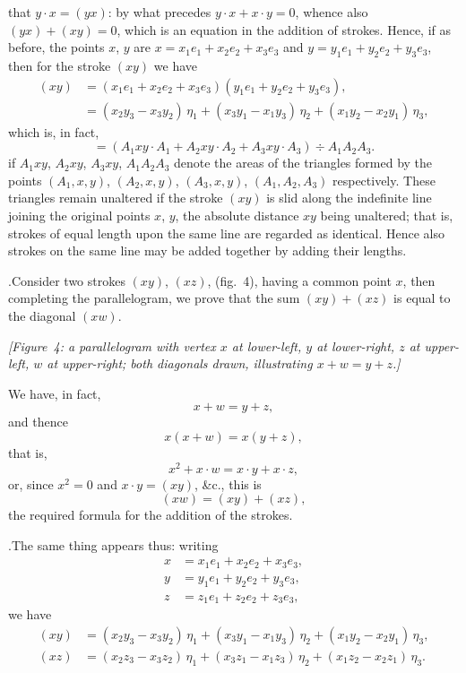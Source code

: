 \documentclass[11pt]{article}
\begin{document}
\noindent that $y\cdot x = (yx)$: by what precedes $y\cdot x + x\cdot y = 0$, whence also $(yx) + (xy) = 0$, which is an equation in the addition of strokes. Hence, if as before, the points $x$, $y$ are $x = x_{1}e_{1} + x_{2}e_{2} + x_{3}e_{3}$ and $y = y_{1}e_{1} + y_{2}e_{2} + y_{3}e_{3}$, then for the stroke $(xy)$ we have
\begin{align*}
(xy) &= (x_{1}e_{1} + x_{2}e_{2} + x_{3}e_{3})(y_{1}e_{1} + y_{2}e_{2} + y_{3}e_{3}), \\
&= (x_{2}y_{3} - x_{3}y_{2})\,\eta_{1} + (x_{3}y_{1} - x_{1}y_{3})\,\eta_{2} + (x_{1}y_{2} - x_{2}y_{1})\,\eta_{3},
\end{align*}
which is, in fact,
\[
= (A_{1}xy\cdot A_{1} + A_{2}xy\cdot A_{2} + A_{3}xy\cdot A_{3})\div A_{1}A_{2}A_{3}.
\]
if $A_{1}xy$, $A_{2}xy$, $A_{3}xy$, $A_{1}A_{2}A_{3}$ denote the areas of the triangles formed by the points $(A_{1}, x, y)$, $(A_{2}, x, y)$, $(A_{3}, x, y)$, $(A_{1}, A_{2}, A_{3})$ respectively. These triangles remain unaltered if the stroke $(xy)$ is slid along the indefinite line joining the original points $x$, $y$, the absolute distance $xy$ being unaltered; that is, strokes of equal length upon the same line are regarded as identical. Hence also strokes on the same line may be added together by adding their lengths.

\medskip

.\quad Consider two strokes $(xy)$, $(xz)$, (fig.~4), having a common point $x$, then completing the parallelogram, we prove that the sum $(xy) + (xz)$ is equal to the diagonal $(xw)$.

\medskip

\noindent\textit{[Figure~4: a parallelogram with vertex $x$ at lower-left, $y$ at lower-right, $z$ at upper-left, $w$ at upper-right; both diagonals drawn, illustrating $x + w = y + z$.]}

\medskip

\noindent We have, in fact,
\[
x + w = y + z,
\]
and thence
\[
x(x + w) = x(y + z),
\]
that is,
\[
x^{2} + x\cdot w = x\cdot y + x\cdot z,
\]
or, since $x^{2} = 0$ and $x\cdot y = (xy)$, \&c., this is
\[
(xw) = (xy) + (xz),
\]
the required formula for the addition of the strokes.

\medskip

.\quad The same thing appears thus: writing
\begin{align*}
x &= x_{1}e_{1} + x_{2}e_{2} + x_{3}e_{3}, \\
y &= y_{1}e_{1} + y_{2}e_{2} + y_{3}e_{3}, \\
z &= z_{1}e_{1} + z_{2}e_{2} + z_{3}e_{3},
\end{align*}
we have
\begin{align*}
(xy) &= (x_{2}y_{3} - x_{3}y_{2})\,\eta_{1} + (x_{3}y_{1} - x_{1}y_{3})\,\eta_{2} + (x_{1}y_{2} - x_{2}y_{1})\,\eta_{3}, \\
(xz) &= (x_{2}z_{3} - x_{3}z_{2})\,\eta_{1} + (x_{3}z_{1} - x_{1}z_{3})\,\eta_{2} + (x_{1}z_{2} - x_{2}z_{1})\,\eta_{3}.
\end{align*}
\end{document}

